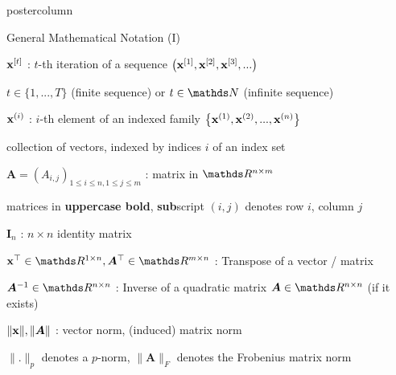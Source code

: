 \documentclass{beamer}
\begin{document}
\begin{frame}[fragile]{}
\begin{columns}
\begin{column}{.31\textwidth}
\begin{beamercolorbox}[center]{postercolumn}
\begin{minipage}{.98\textwidth}
{\begin{myblock}{General Mathematical Notation (I)}
						\begin{codebox}
						    $\mathbf{x}^{[t]}$ :  $t$-th iteration of a sequence $\left(\mathbf{x}^{[1]}, \mathbf{x}^{[2]}, \mathbf{x}^{[3]}, ...\right)$
						\end{codebox}
						\hspace*{1ex} $t \in \{1, ..., T\}$ (finite sequence) or $t \in \N$ (infinite sequence)
						\\
						\begin{codebox}
						    $\mathbf{x}^{(i)}$ :  $i$-th element of an indexed family $\left\{\mathbf{x}^{(1)}, \mathbf{x}^{(2)}, ..., \mathbf{x}^{(n)}\right\}$
						\end{codebox}
						\hspace*{1ex} collection of vectors, indexed by indices $i$ of an index set\\
						\begin{codebox}
						    $\bm{A} = \left(A_{i,j}\right)_{1\le i \le n, 1 \le j \le m}$ :  matrix in $\R^{n \times m} $
						\end{codebox}
						\hspace*{1ex} matrices in \textbf{uppercase bold}, \textbf{sub}script $(i,j)$ denotes row $i$, column $j$
						\\
						\begin{codebox}
							$\mathbf{I}_n$ : $n \times n$ identity matrix
						\end{codebox}
						\hspace*{1ex} %
						\begin{codebox}
						    $\xv^\top \in \R^{1 \times n}, \bm{A}^\top \in \R^{m \times n}$ :  Transpose of a vector / matrix
						\end{codebox}
						\hspace*{1ex}
						\begin{codebox}
						    $\bm{A}^{-1} \in \R^{n \times n}$ :  Inverse of a quadratic matrix $\bm{A} \in \R^{n \times n}$ (if it exists)
						\end{codebox}
						\hspace*{1ex}
						\begin{codebox}
						    $\|\mathbf{x}\|, \|\bm{A}\|$ : vector norm, (induced) matrix norm
						\end{codebox}
						\hspace*{1ex} %
						$\|.\|_p$ denotes a $p$-norm, $\|\bm{A}\|_F$ denotes the Frobenius matrix norm

\end{myblock}}
\end{minipage}
\end{beamercolorbox}
\end{column}
\end{columns}
\end{frame}
\end{document}
